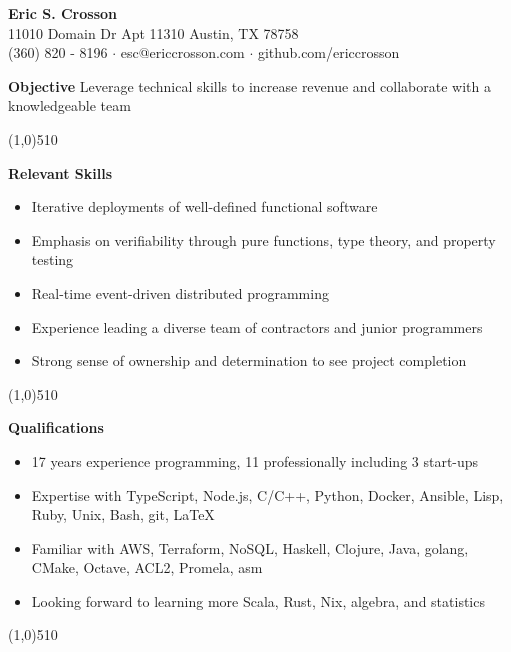 \documentclass{report}
\newcommand{\cut}{\begin{center} \line(1,0){510} \end{center}}
\begin{document}
\pagestyle{empty}
\setlength\parindent{0pt}

\begin{center}
  \textbf{Eric S. Crosson} \\
  11010 Domain Dr Apt 11310 Austin, TX 78758 \\
  (360) 820 - 8196 $\cdot$ esc@ericcrosson.com $\cdot$ github.com/ericcrosson
\end{center}

\textbf{Objective} \hspace{1mm} Leverage technical skills to increase
revenue and collaborate with a knowledgeable team

\cut{}

\textbf{Relevant Skills}
\begin{itemize}[label=$\cdot$]
\item Iterative deployments of well-defined functional software
\item Emphasis on verifiability through pure functions, type theory, and property testing
\item Real-time event-driven distributed programming
\item Experience leading a diverse team of contractors and junior programmers
\item Strong sense of ownership and determination to see project completion
\end{itemize}

\cut{}

\textbf{Qualifications}
\begin{itemize}[label=$\cdot$]
\item 17 years experience programming, 11 professionally including 3 start-ups
\item Expertise with TypeScript, Node.js, C/C++, Python, Docker, Ansible, Lisp, Ruby, Unix, Bash, git, \LaTeX{}
\item Familiar with AWS, Terraform, NoSQL, Haskell, Clojure, Java, golang, CMake, Octave, ACL2, Promela, asm
\item Looking forward to learning more Scala, Rust, Nix, algebra, and statistics
\end{itemize}

\cut{}
\end{document}
